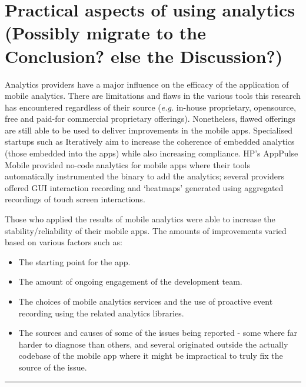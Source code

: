 \section[Practical aspects of using analytics]{Practical aspects of using analytics \\ \small{(Possibly migrate to the Conclusion? else the Discussion?)}}
Analytics providers have a major influence on the efficacy of the application of mobile analytics. There are limitations and flaws in the various tools this research has encountered regardless of their source (\emph{e.g.} in-house proprietary, opensource, free and paid-for commercial proprietary offerings). Nonetheless, flawed offerings are still able to be used to deliver improvements in the mobile apps. Specialised startups such as Iteratively aim to increase the coherence of embedded analytics (those embedded into the apps) while also increasing compliance. HP's AppPulse Mobile provided no-code analytics for mobile apps where their tools automatically instrumented the binary to add the analytics; several providers offered GUI interaction recording and `heatmaps' generated using aggregated recordings of touch screen interactions.

Those who applied the results of mobile analytics were able to increase the stability/reliability of their mobile apps. The amounts of improvements varied based on various factors such as:
\begin{itemize}
    \itemsep0em
    \item The starting point for the app.
    \item The amount of ongoing engagement of the development team.
    \item The choices of mobile analytics services and the use of proactive event recording using the related analytics libraries.
    \item The sources and causes of some of the issues being reported - some where far harder to diagnose than others, and several originated outside the actually codebase of the mobile app where it might be impractical to truly fix the source of the issue.
\end{itemize}

\noindent
\rule{\textwidth}{0.4pt}

\clearpage
